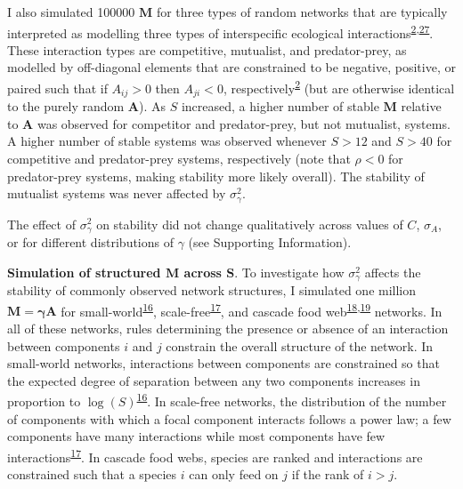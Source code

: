 \documentclass[]{article}
\begin{document}
I also simulated 100000 \(\mathbf{M}\) for three types of random
networks that are typically interpreted as modelling three types of
interspecific ecological
interactions\textsuperscript{\protect\hyperlink{ref-Allesina2012}{2},\protect\hyperlink{ref-Allesina2011}{27}}.
These interaction types are competitive, mutualist, and predator-prey,
as modelled by off-diagonal elements that are constrained to be
negative, positive, or paired such that if \(A_{ij} > 0\) then
\(A_{ji} < 0\),
respectively\textsuperscript{\protect\hyperlink{ref-Allesina2012}{2}}
(but are otherwise identical to the purely random \(\mathbf{A}\)). As
\(S\) increased, a higher number of stable \(\mathbf{M}\) relative to
\(\mathbf{A}\) was observed for competitor and predator-prey, but not
mutualist, systems. A higher number of stable systems was observed
whenever \(S > 12\) and \(S > 40\) for competitive and predator-prey
systems, respectively (note that \(\rho < 0\) for predator-prey systems,
making stability more likely overall). The stability of mutualist
systems was never affected by \(\sigma^{2}_{\gamma}\).

The effect of \(\sigma^{2}_{\gamma}\) on stability did not change
qualitatively across values of \(C\), \(\sigma_{A}\), or for different
distributions of \(\gamma\) (see Supporting Information).

\textbf{Simulation of structured \(\mathbf{M}\) across \(\mathbf{S}\)}.
To investigate how \(\sigma^{2}_{\gamma}\) affects the stability of
commonly observed network structures, I simulated one million
\(\mathbf{M = \gamma A}\) for
small-world\textsuperscript{\protect\hyperlink{ref-Watts1998}{16}},
scale-free\textsuperscript{\protect\hyperlink{ref-Albert2002}{17}}, and
cascade food
web\textsuperscript{\protect\hyperlink{ref-Solow1998}{18},\protect\hyperlink{ref-Williams2000}{19}}
networks. In all of these networks, rules determining the presence or
absence of an interaction between components \(i\) and \(j\) constrain
the overall structure of the network. In small-world networks,
interactions between components are constrained so that the expected
degree of separation between any two components increases in proportion
to \(\log(S)\)\textsuperscript{\protect\hyperlink{ref-Watts1998}{16}}.
In scale-free networks, the distribution of the number of components
with which a focal component interacts follows a power law; a few
components have many interactions while most components have few
interactions\textsuperscript{\protect\hyperlink{ref-Albert2002}{17}}. In
cascade food webs, species are ranked and interactions are constrained
such that a species \(i\) can only feed on \(j\) if the rank of
\(i > j\).
\end{document}
